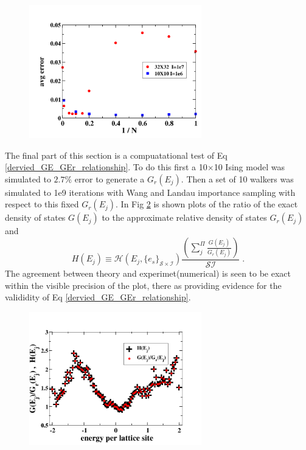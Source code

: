 \documentclass[aps,prl,reprint,superscriptaddress,showkeys]{revtex4-1}
\begin{document}
\begin{figure}
\includegraphics[width=7.5cm]{./figures/randN_3232_1010_S100.png}\\
\caption{\label{N_dependence}}
\end{figure}

The final part of this section is a compuatational test of Eq \ref{dervied_GE_GEr_relationship}. To do this first a 10$\times$10 Ising model was simulated to $2.7\%$ error to generate a $G_r(E_j)$. Then a set of 10 walkers was simulated to 1e9 iterations  with Wang and Landau importance sampling with respect to this fixed $G_r(E_j)$. In Fig \ref{GE_GEr_test} is shown plots of the ratio of the exact density of states $G(E_j)$ to the approximate relative density of states $G_r(E_j)$ and 
\begin{equation}
H(E_j) \equiv  \mathcal{H}(E_j,\{e_s\}_{\mathcal{S}\times\mathcal{I}})\frac{(\sum_j^{\Pi}\frac{G(E_j)}{G_r(E_j)})}{\mathcal{S I}}    \;.
\end{equation}
The agreement between theory and experimet(numerical) is seen to be exact within the visible precision of the plot, there as providing evidence for the valididity of Eq \ref{dervied_GE_GEr_relationship}. 

\begin{figure}
\includegraphics[width=7.5cm]{./figures/test_GE_div_Gr.png}
\caption{\label{GE_GEr_test}}
\end{figure}
\end{document}
